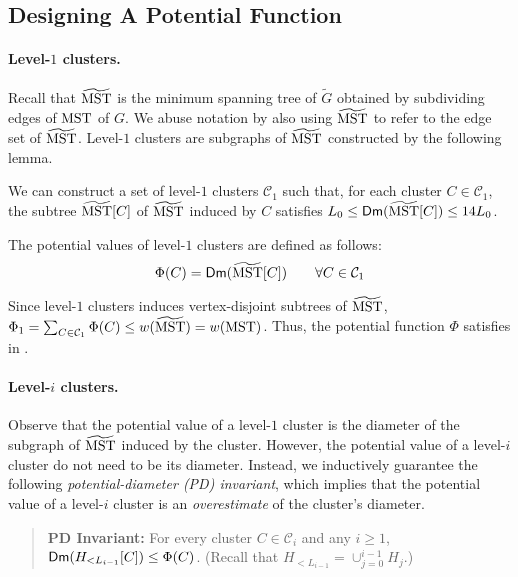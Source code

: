 \subsection{Designing A Potential Function}\label{subsec:DesignPotential}

\paragraph{Level-$1$ clusters.~} Recall that $\widetilde{\mathrm{MST}}$ is the minimum spanning tree of $\tilde{G}$ obtained by subdividing edges of $\mathrm{MST}$ of $G$. We abuse notation by also using $\widetilde{\mathrm{MST}}$ to refer to the edge set of $\widetilde{\mathrm{MST}}$. Level-$1$ clusters  are subgraphs of $\widetilde{\mathrm{MST}}$ constructed by the following lemma.


\begin{lemma}\label{lm:level1Const}We can construct a set of level-$1$ clusters $\mathcal{C}_1$ such that, for each cluster $C\in \mathcal{C}_1$, the subtree $\widetilde{\mathrm{MST}}[C]$ of $\widetilde{\mathrm{MST}}$ induced by $C$ satisfies $L_0 \leq \mathsf{Dm}(\widetilde{\mathrm{MST}}[C]) \leq 14L_0$. 
\end{lemma} 

The potential values of level-$1$ clusters are defined as follows:	
	\begin{equation}\label{eq:Level1Poten}
		\Phi(C) = \mathsf{Dm}(\widetilde{\mathrm{MST}}[C]) \qquad \forall C \in \mathcal{C}_1
	\end{equation}

Since level-$1$ clusters induces vertex-disjoint subtrees of $\widetilde{\mathrm{MST}}$, $\Phi_1 = \sum_{C\in \mathcal{C}_1}\Phi(C) \leq w(\widetilde{\mathrm{MST}}) = w(\mathrm{MST})$. Thus, the potential function $\Phi$ satisfies  in . 


\paragraph{Level-$i$ clusters.~} Observe that the potential value of a level-$1$ cluster is the diameter of the subgraph of $\widetilde{\mathrm{MST}}$ induced by the cluster. However, the potential value of a level-$i$ cluster  do not need to be its diameter. Instead, we inductively guarantee the following  {\em potential-diameter (PD) invariant}, which implies that the potential value of a level-$i$ cluster is  an {\em overestimate} of the cluster's diameter.
\hypertarget{PD}{}
\begin{quote}
	\textbf{PD Invariant:} For every cluster $C \in \mathcal{C}_{i}$ and any $i\geq 1$, $\mathsf{Dm}(H_{< L_{i-1}}[C]) \leq \Phi(C)$. (Recall that $H_{< L_{i-1}} = \cup_{j=0}^{i-1} H_j$.)
\end{quote}

